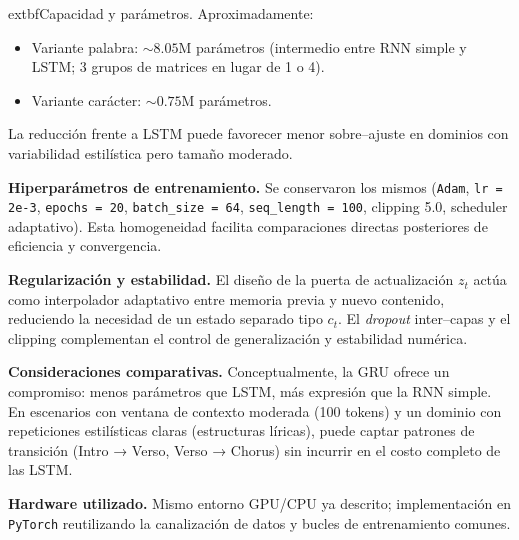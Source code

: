 \documentclass[paper=letter, fontsize=11pt, draft=false]{scrartcl}
\numberwithin{equation}{section} %
\numberwithin{figure}{section} %
\numberwithin{table}{section} %
\numberwithin{subsection}{section}
\begin{document}
	extbf{Capacidad y parámetros.} Aproximadamente:
\begin{itemize}
    \item Variante palabra: $\sim 8.05$M parámetros (intermedio entre RNN simple y LSTM; 3 grupos de matrices en lugar de 1 o 4).
    \item Variante carácter: $\sim 0.75$M parámetros.
\end{itemize}
La reducción frente a LSTM puede favorecer menor sobre–ajuste en dominios con variabilidad estilística pero tamaño moderado.

	\textbf{Hiperparámetros de entrenamiento.} Se conservaron los mismos (\texttt{Adam}, \texttt{lr = 2e-3}, \texttt{epochs = 20}, \texttt{batch\_size = 64}, \texttt{seq\_length = 100}, clipping 5.0, scheduler adaptativo). Esta homogeneidad facilita comparaciones directas posteriores de eficiencia y convergencia.

	\textbf{Regularización y estabilidad.} El diseño de la puerta de actualización $z_t$ actúa como interpolador adaptativo entre memoria previa y nuevo contenido, reduciendo la necesidad de un estado separado tipo $c_t$. El \emph{dropout} inter–capas y el clipping complementan el control de generalización y estabilidad numérica.

	\textbf{Consideraciones comparativas.} Conceptualmente, la GRU ofrece un compromiso: menos parámetros que LSTM, más expresión que la RNN simple. En escenarios con ventana de contexto moderada (100 tokens) y un dominio con repeticiones estilísticas claras (estructuras líricas), puede captar patrones de transición (Intro → Verso, Verso → Chorus) sin incurrir en el costo completo de las LSTM.

	\textbf{Hardware utilizado.} Mismo entorno GPU/CPU ya descrito; implementación en \texttt{PyTorch} reutilizando la canalización de datos y bucles de entrenamiento comunes.


\newpage
\end{document}
